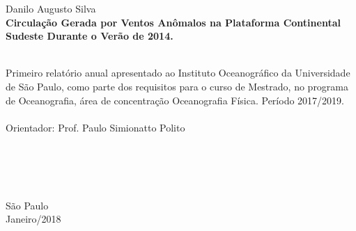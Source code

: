 \documentclass[a4paper, 11pt, oneside]{Thesis}  %
\begin{document}
\begin{center}
\thispagestyle{empty}
\Large Danilo Augusto Silva \\[3.5cm] 
\textbf{\huge Circulação Gerada por Ventos Anômalos na Plataforma Continental Sudeste Durante o Verão de 2014. } 
\ \\ \ 

\bigskip\bigskip\bigskip\bigskip\bigskip\bigskip\bigskip\bigskip

\begin{flushright}
  \begin{minipage}{8cm}
  \small Primeiro relatório anual apresentado ao Instituto Oceanográfico da Universidade de São Paulo, como parte dos requisitos
  para o curso de Mestrado, no programa de Oceanografia, área de concentração Oceanografia Física. Período 2017/2019. \\ \ \\
  Orientador: Prof. Paulo Simionatto Polito\\ \ \\ \ \\ \ \\
  \end{minipage}
\end{flushright}

\ \\[3cm] São Paulo \\ Janeiro/2018
\end{center} 
 

\tableofcontents  %

\listoffigures  %



\mainmatter	  %
\pagestyle{fancy}  %
\end{document}
